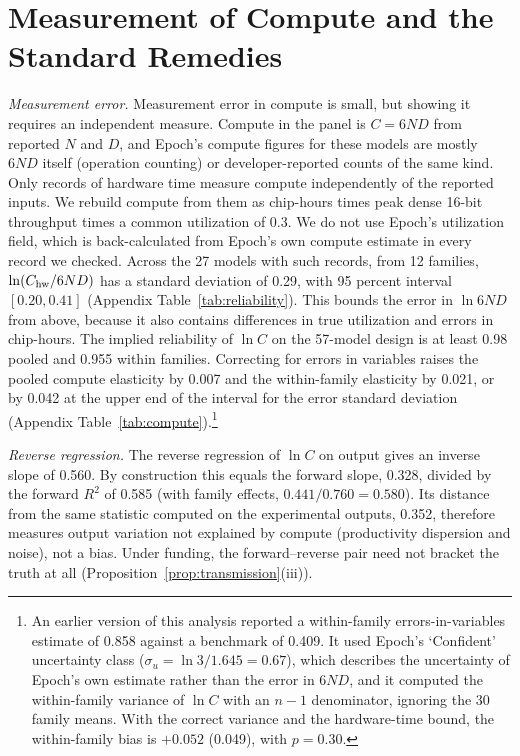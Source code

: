 \documentclass[AER,finalmode]{AEA}
\theoremstyle{definition}
\theoremstyle{remark}
\begin{document}
\section{Measurement of Compute and the Standard Remedies}\label{sec:compute}

\textit{Measurement error.} Measurement error in compute is small, but showing it requires an independent measure.
Compute in the panel is $C=6ND$ from reported $N$ and $D$, and Epoch's compute figures for these models are mostly
$6ND$ itself (operation counting) or developer-reported counts of the same kind. Only records of hardware time measure
compute independently of the reported inputs. We rebuild compute from them as chip-hours times peak dense 16-bit
throughput times a common utilization of 0.3. We do not use Epoch's utilization field, which is back-calculated from
Epoch's own compute estimate in every record we checked. Across the 27 models with such records, from 12 families,
$\ln(C_{\rm hw}/6ND)$ has a standard deviation of 0.29, with 95 percent interval $[0.20,0.41]$ (Appendix
Table~\ref{tab:reliability}). This bounds the error in
$\ln6ND$ from above, because it also contains differences in true utilization and errors in chip-hours. The implied
reliability of $\ln C$ on the 57-model design is at least 0.98 pooled and 0.955 within families. Correcting for errors
in variables raises the pooled compute elasticity by 0.007 and the within-family elasticity by 0.021, or by 0.042 at
the upper end of the interval for the error standard deviation (Appendix Table~\ref{tab:compute}).\footnote{An earlier
version of this analysis reported a within-family errors-in-variables estimate of 0.858 against a benchmark of 0.409.
It used Epoch's `Confident' uncertainty class ($\sigma_u=\ln3/1.645=0.67$), which describes the uncertainty of Epoch's
own estimate rather than the error in $6ND$, and it computed the within-family variance of $\ln C$ with an $n-1$
denominator, ignoring the 30 family means. With the correct variance and the hardware-time bound, the within-family
bias is $+0.052$ (0.049), with $p=0.30$.}

\textit{Reverse regression.} The reverse regression of $\ln C$ on output gives an inverse slope of 0.560. By
construction this equals the forward slope, 0.328, divided by the forward $R^2$ of 0.585 (with family effects,
$0.441/0.760=0.580$). Its distance from the same statistic computed on the experimental outputs, 0.352, therefore
measures output variation not explained by compute (productivity dispersion and noise), not a bias. Under funding,
the forward--reverse pair need not bracket the truth at all (Proposition~\ref{prop:transmission}(iii)).
\end{document}

